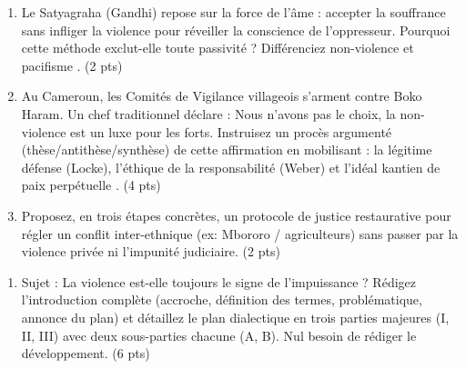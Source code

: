 \documentclass[11pt]{article}
\begin{document}
\begin{exercice}
\begin{enumerate}
    \item Le \og Satyagraha \fg{} (Gandhi) repose sur la \og force de l'âme \fg{} : accepter la souffrance sans infliger la violence pour réveiller la conscience de l'oppresseur. Pourquoi cette méthode exclut-elle toute passivité ? Différenciez \og non-violence \fg{} et \og pacifisme \fg{}. (2 pts)
    \item Au Cameroun, les \og Comités de Vigilance \fg{} villageois s'arment contre Boko Haram. Un chef traditionnel déclare : \og Nous n'avons pas le choix, la non-violence est un luxe pour les forts. \fg{} Instruisez un procès argumenté (thèse/antithèse/synthèse) de cette affirmation en mobilisant : la légitime défense (Locke), l'éthique de la responsabilité (Weber) et l'idéal kantien de \og paix perpétuelle \fg{}. (4 pts)
    \item Proposez, en trois étapes concrètes, un protocole de \og justice restaurative \fg{} pour régler un conflit inter-ethnique (ex: Mbororo / agriculteurs) sans passer par la violence privée ni l'impunité judiciaire. (2 pts)
\end{enumerate}
\end{exercice}

\begin{exercice}
\begin{enumerate}
    \item Sujet : \og La violence est-elle toujours le signe de l'impuissance ? \fg{}
    Rédigez l'introduction complète (accroche, définition des termes, problématique, annonce du plan) et détaillez le plan dialectique en trois parties majeures (I, II, III) avec deux sous-parties chacune (A, B). Nul besoin de rédiger le développement. (6 pts)
\end{enumerate}
\end{exercice}
\end{document}
